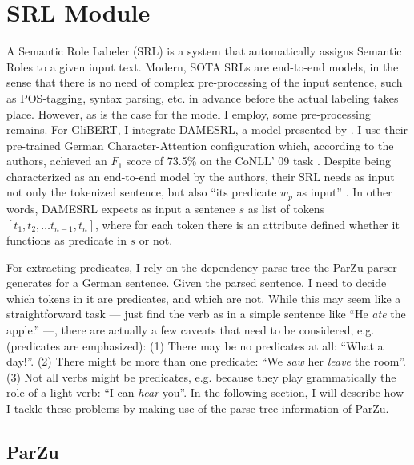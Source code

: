 \section{SRL Module}
\label{sec:srl-module}

A Semantic Role Labeler (SRL) is a system that automatically
assigns Semantic Roles to a given input text. Modern, SOTA
SRLs are end-to-end models, in the sense that there is no
need of complex pre-processing of the input sentence, such as
POS-tagging, syntax parsing, etc. in advance before the actual
labeling takes place. However, as is the case for the model I
employ, some pre-processing remains. For GliBERT, I integrate
DAMESRL, a model presented by \cite{do2018flexible}. I use
their pre-trained German Character-Attention configuration
which, according to the authors, achieved an $F_1$ score of
73.5\% on the CoNLL' 09 task \citep{hajivc2009conll}. Despite
being characterized as an end-to-end model by the authors,
their SRL needs as input not only the tokenized sentence, but
also ``its predicate $w_p$ as input'' \citep{do2018flexible}.
In other words, DAMESRL expects as input a sentence $s$ as
list of tokens $[ t_1, t_2, \dotsc t_{n-1}, t_n ]$, where for
each token there is an attribute defined whether it functions
as predicate in $s$ or not.

For extracting predicates, I rely on the dependency parse tree the ParZu parser
\cite{sennrich2013exploiting} generates for a German sentence. Given the parsed
sentence, I need to decide which tokens in it are predicates, and which are not.
While this may seem like a straightforward task --- just find the verb as in a
simple sentence like ``He \emph{ate} the apple.'' ---, there are actually a few
caveats that need to be considered, e.g. (predicates are emphasized): (1) There
may be no predicates at all: ``What a day!''. (2) There might be more than one
predicate: ``We \emph{saw} her \emph{leave} the room''. (3) Not all verbs might
be predicates, e.g. because they play grammatically the role of a light verb: ``I
can \emph{hear} you''. In the following section, I will describe how I tackle
these problems by making use of the parse tree information of ParZu.


\subsection{ParZu}

